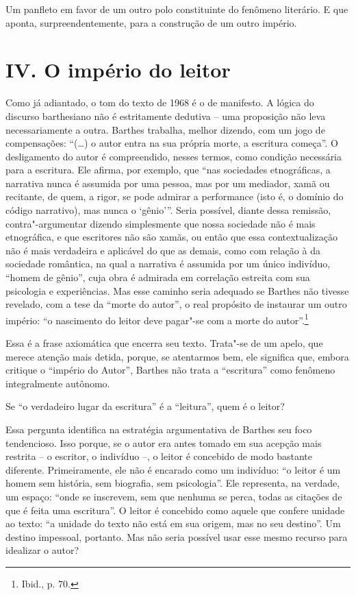 Um panfleto em favor de um outro polo constituinte do fenômeno
literário. E que aponta, surpreendentemente, para a construção de um
outro império.

\section*{IV. O império do leitor}

Como já adiantado, o tom do texto de 1968 é o de manifesto. A lógica do
discurso barthesiano não é estritamente dedutiva -- uma proposição não
leva necessariamente a outra. Barthes trabalha, melhor dizendo, com um
jogo de compensações: ``(\ldots{}) o autor entra na sua própria morte, a
escritura começa''. O desligamento do autor é compreendido, nesses
termos, como condição necessária para a escritura. Ele afirma, por
exemplo, que ``nas sociedades etnográficas, a narrativa nunca é assumida
por uma pessoa, mas por um mediador, xamã ou recitante, de quem, a
rigor, se pode admirar a performance (isto é, o domínio do código
narrativo), mas nunca o `gênio'''. Seria possível, diante dessa
remissão, contra"-argumentar dizendo simplesmente que nossa sociedade não
é mais etnográfica, e que escritores não são xamãs, ou então que essa
contextualização não é mais verdadeira e aplicável do que as demais,
como com relação à da sociedade romântica, na qual a narrativa é
assumida por um único indivíduo, ``homem de gênio'', cuja obra é
admirada em correlação estreita com sua psicologia e experiências. Mas
esse caminho seria adequado se Barthes não tivesse revelado, com a tese
da ``morte do autor'', o real propósito de instaurar um outro império:
``o nascimento do leitor deve pagar"-se com a morte do autor''.\footnote{Ibid.,
  p. 70.}

Essa é a frase axiomática que encerra seu texto. Trata"-se de um apelo,
que merece atenção mais detida, porque, se atentarmos bem, ele significa
que, embora critique o ``império do Autor'', Barthes não trata a
``escritura'' como fenômeno integralmente autônomo.

Se ``o verdadeiro lugar da escritura'' é a ``leitura'', quem é o leitor?

Essa pergunta identifica na estratégia argumentativa de Barthes seu foco
tendencioso. Isso porque, se o autor era antes tomado em sua acepção
mais restrita -- o escritor, o indivíduo --, o leitor é concebido de
modo bastante diferente. Primeiramente, ele não é encarado como um
indivíduo: ``o leitor é um homem sem história, sem biografia, sem
psicologia''. Ele representa, na verdade, um espaço: ``onde se
inscrevem, sem que nenhuma se perca, todas as citações de que é feita
uma escritura''. O leitor é concebido como aquele que confere unidade ao
texto: ``a unidade do texto não está em sua origem, mas no seu
destino''. Um destino impessoal, portanto. Mas não seria possível usar
esse mesmo recurso para idealizar o autor?

